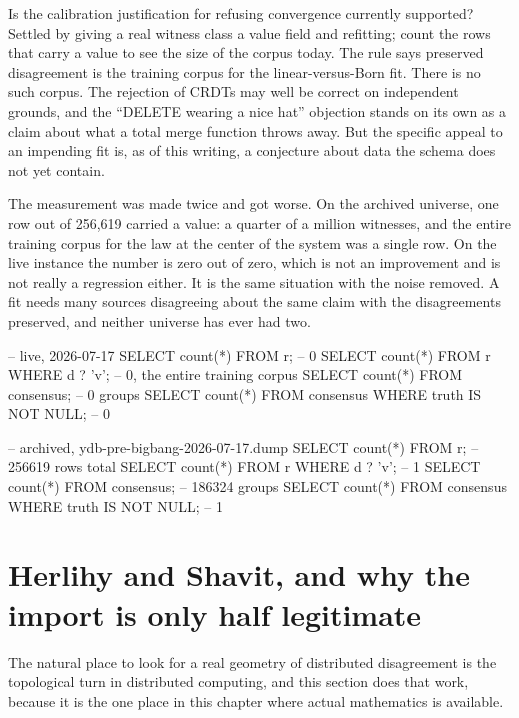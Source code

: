 \begin{Open}{Is the calibration justification for refusing convergence currently supported?}{Settled by giving a real witness class a value field and refitting; count the rows that carry a value to see the size of the corpus today.}
The rule says preserved disagreement is the training corpus for the linear-versus-Born fit. There is no such corpus. The rejection of CRDTs may well be correct on independent grounds, and the ``DELETE wearing a nice hat'' objection stands on its own as a claim about what a total merge function throws away. But the specific appeal to an impending fit is, as of this writing, a conjecture about data the schema does not yet contain.

The measurement was made twice and got worse. On the archived universe, one row out of 256,619 carried a value: a quarter of a million witnesses, and the entire training corpus for the law at the center of the system was a single row. On the live instance the number is zero out of zero, which is not an improvement and is not really a regression either. It is the same situation with the noise removed. A fit needs many sources disagreeing about the same claim with the disagreements preserved, and neither universe has ever had two.

\begin{Check}
-- live, 2026-07-17
SELECT count(*) FROM r;                                  -- 0
SELECT count(*) FROM r WHERE d ? 'v';                    -- 0, the entire training corpus
SELECT count(*) FROM consensus;                          -- 0 groups
SELECT count(*) FROM consensus WHERE truth IS NOT NULL;  -- 0

-- archived, ydb-pre-bigbang-2026-07-17.dump
SELECT count(*) FROM r;                                  -- 256619 rows total
SELECT count(*) FROM r WHERE d ? 'v';                    -- 1
SELECT count(*) FROM consensus;                          -- 186324 groups
SELECT count(*) FROM consensus WHERE truth IS NOT NULL;  -- 1
\end{Check}
\end{Open}

\section{Herlihy and Shavit, and why the import is only half legitimate}

The natural place to look for a real geometry of distributed disagreement is the topological turn in distributed computing, and this section does that work, because it is the one place in this chapter where actual mathematics is available.

